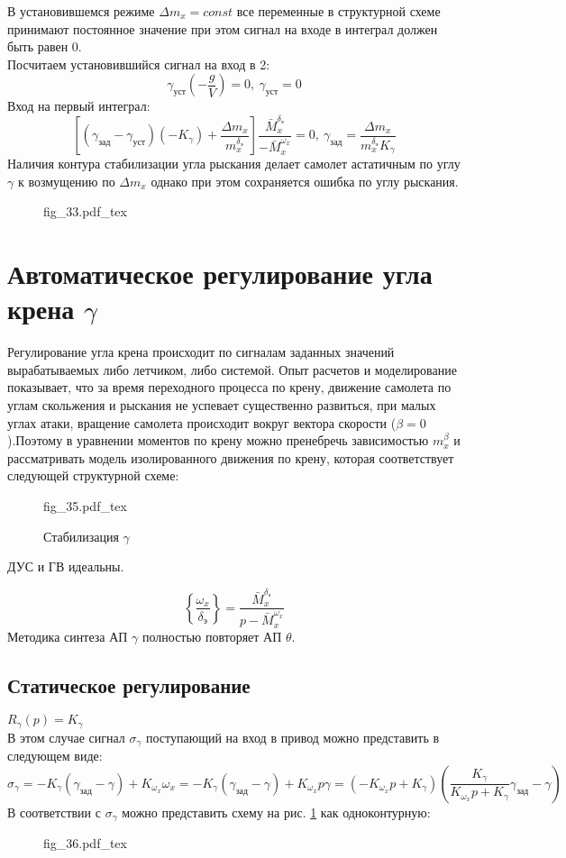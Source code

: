 \documentclass{article}
\begin{document}
В установившемся режиме $\Delta m_x = const$ все переменные в структурной схеме принимают постоянное значение при этом сигнал на входе в интеграл должен быть равен 0.\\
Посчитаем установившийся сигнал на вход в 2:
\[
\gamma_{уст}(-\frac{g}{V}) = 0,\ \gamma_{уст} = 0 
\]
Вход на первый интеграл:
\[
\left[(\gamma_{зад} - \gamma_{уст})(-K_\gamma)+\frac{\Delta m_x}{m_x^{\delta_э}}\right]\frac{\bar{M}_x^{\delta_э}}{-\bar{M}_x^{\omega_x}}= 0,\ \gamma_{зад}=\frac{\Delta m_x}{m_x^{\delta_э}K_{\gamma}} 
\]
Наличия контура стабилизации угла рыскания делает самолет астатичным по углу $\gamma$ к возмущению по $\Delta m_x$ однако при этом сохраняется ошибка по углу рыскания.

\begin{figure}[ht]
\centering
{fig_33.pdf_tex}
\end{figure}

\section{Автоматическое регулирование угла крена $\gamma$}
Регулирование угла крена происходит по сигналам заданных значений вырабатываемых либо летчиком, либо системой. Опыт расчетов и моделирование показывает, что за время переходного процесса по крену, движение самолета по углам скольжения и рыскания не успевает существенно развиться, при малых углах атаки, вращение самолета происходит вокруг вектора скорости ($\beta = 0$).Поэтому в уравнении моментов по крену можно пренебречь зависимостью $m_x^\beta$ и рассматривать модель изолированного движения по крену, которая соответствует следующей структурной схеме:

\begin{figure}[ht]
\centering
{fig_35.pdf_tex}
\caption{Стабилизация $\gamma$}
\label{fig:stab_gamma}
\end{figure}
ДУС и ГВ идеальны.

\[
\left\{\frac{\omega_x}{\delta_э} \right\} =\frac{\bar{M}_x^{\delta_э}}{ p - \bar{M}_x^{\omega_x}} 
\]
Методика синтеза АП $\gamma$ полностью повторяет АП $\theta$.

\subsection{Статическое регулирование}
$R_\gamma(p) = K_\gamma$\\
В этом случае сигнал $\sigma_\gamma$ поступающий на вход в привод можно представить в следующем виде: 
\[
\sigma_\gamma =  - K_\gamma(\gamma_{зад} - \gamma) + K_{\omega_x} \omega_x = - K_{\gamma} (\gamma_{зад} - \gamma) + K_{\omega_x} p \gamma = (-K_{\omega_x} p + K_\gamma) \left(\frac{K_\gamma}{K_{\omega_x}p + K_\gamma} \gamma_{зад} - \gamma \right)
\]
В соответствии с $\sigma_\gamma$ можно представить схему на рис. \ref{fig:stab_gamma} как одноконтурную:\\
\begin{figure}[H]
{fig_36.pdf_tex}
\end{figure}
\end{document}
